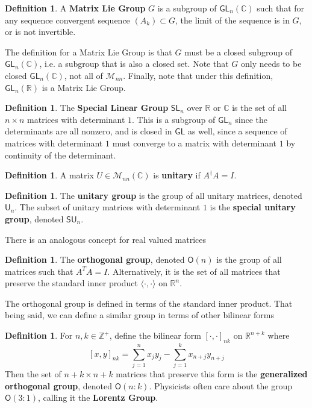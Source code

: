 \documentclass[psamsfonts]{amsart}
\theoremstyle{definition}
\newtheorem{defn}[thm]{Definition}
\theoremstyle{remark}
\newcommand{\R}{\mathbb{R}}
\newcommand{\Z}{\mathbb{Z}}
\newcommand{\C}{\mathbb{C}}
\newcommand{\GL}{\mathsf{GL}}
\newcommand{\SL}{\mathsf{SL}}
\newcommand{\SU}{\mathsf{SU}}
\begin{document}
\begin{defn}
A \textbf{Matrix Lie Group} $G$ is a subgroup of $\GL_n(\C)$ such that for any sequence convergent sequence $(A_k) \subset G$, the limit of the sequence is in $G$, or is not invertible.
\end{defn}

The definition for a Matrix Lie Group is that $G$ must be a closed subgroup of $\GL_n(\C)$, i.e. a subgroup that is also a closed set. Note that $G$ only needs to be closed $\GL_n(\C)$, not all of $\mathcal{M}_{nn}$. Finally, note that under this definition, $\GL_n(\R)$ is a Matrix Lie Group.

\begin{defn}
The \textbf{Special Linear Group} $\SL_n$ over $\R$ or $\C$ is the set of all $n \times n$ matrices with determinant $1$. This is a subgroup of $\GL_n$ since the determinants are all nonzero, and is closed in $\GL$ as well, since a sequence of matrices with determinant $1$ must converge to a matrix with determinant $1$ by continuity of the determinant.
\end{defn}

\begin{defn}
A matrix $U \in \mathcal{M}_{nn}(\C)$ is \textbf{unitary} if $A^\dagger A = I$.
\end{defn}

\begin{defn}
The \textbf{unitary group} is the group of all unitary matrices, denoted $\mathsf{U}_n$. The subset of unitary matrices with determinant $1$ is the \textbf{special unitary group}, denoted $\SU_n$.
\end{defn}

There is an analogous concept for real valued matrices
\begin{defn}
The \textbf{orthogonal group}, denoted $\mathsf{O}(n)$ is the group of all matrices such that $A^TA = I$. Alternatively, it is the set of all matrices that preserve the standard inner product $\langle \cdot, \cdot \rangle$ on $\R^n$.
\end{defn}

The orthogonal group is defined in terms of the standard inner product. That being said, we can define a similar group in terms of other bilinear forms
\begin{defn}
For $n,k \in \Z^+$, define the bilinear form $[\cdot,\cdot]_{nk}$ on $\R^{n+k}$ where
$$[x,y]_{nk} = \sum_{j = 1}^n x_jy_j - \sum_{j = 1}^{k}x_{n+j}y_{n+j} $$
Then the set of $n+k \times n+k$ matrices that preserve this form is the \textbf{generalized orthogonal group}, denoted $\mathsf{O}(n:k)$. Physicists often care about the group $\mathsf{O}(3:1)$, calling it the \textbf{Lorentz Group}.
\end{defn}
\end{document}
